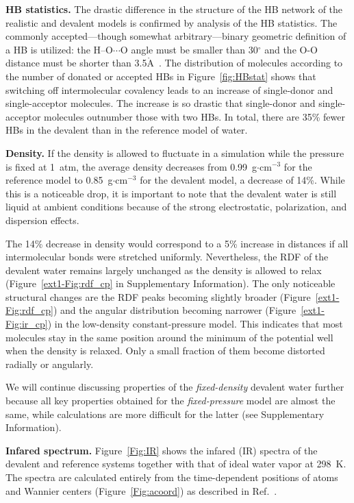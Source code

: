 \documentclass[journal=jacsat,manuscript=article]{achemso}
\newcommand{\Ang}{\ensuremath{\mathring{\text{A}}}}
\begin{document}
\textbf{HB statistics.} The drastic difference in the structure of the HB network of the realistic and devalent models is confirmed by analysis of the HB statistics. 
The commonly accepted---though somewhat arbitrary---binary geometric definition of a HB is utilized: the H--O$\cdots$O angle must be smaller than 30$^{\circ}$ and the O-O distance must be shorter than 3.5\Ang~\cite{rey2002hydrogen,lawrence2003vibrational}. 
The distribution of molecules according to the number of donated or accepted HBs in Figure~\ref{fig:HBstat} shows that switching off intermolecular covalency leads to an increase of single-donor and single-acceptor molecules. 
The increase is so drastic that single-donor and single-acceptor molecules outnumber those with two HBs.
In total, there are 35\% fewer HBs in the devalent than in the reference model of water.

\textbf{Density.} If the density is allowed to fluctuate in a simulation while the pressure is fixed at 1~atm, the average density decreases from 0.99~g$\cdot$cm$^{-3}$ for the reference model to 0.85~g$\cdot$cm$^{-3}$ for the devalent model, a decrease of 14\%. 
While this is a noticeable drop, it is important to note that the devalent water is still liquid at ambient conditions because of the strong electrostatic, polarization, and dispersion effects. 

The 14\% decrease in density would correspond to a 5\% increase in distances if all intermolecular bonds were stretched uniformly. 
Nevertheless, the RDF of the devalent water remains largely unchanged as the density is allowed to relax (Figure~\ref{ext1-Fig:rdf_cp} in Supplementary Information). 
The only noticeable structural changes are the RDF peaks becoming slightly broader (Figure~\ref{ext1-Fig:rdf_cp}) and the angular distribution becoming narrower (Figure~\ref{ext1-Fig:ir_cp}) in the low-density constant-pressure model. 
This indicates that most molecules stay in the same position around the minimum of the potential well when the density is relaxed. 
Only a small fraction of them become distorted radially or angularly. 

We will continue discussing properties of the \emph{fixed-density} devalent water further because all key properties obtained for the \emph{fixed-pressure} model are almost the same, while calculations are more difficult for the latter (see Supplementary Information).


\textbf{Infared spectrum.} Figure~\ref{Fig:IR} shows the infared (IR) spectra of the devalent and reference systems together with that of ideal water vapor at 298~K. The spectra are calculated entirely from the time-dependent positions of atoms and Wannier centers (Figure~\ref{Fig:acoord}) as described in Ref.~.
\end{document}
